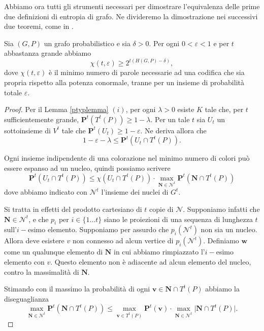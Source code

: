 Abbiamo ora tutti gli strumenti necessari per dimostrare l'equivalenza delle prime due definizioni di entropia di grafo. Ne divideremo la dimostrazione nei successivi due teoremi, come in \cite{Korner1973}. 
\begin{theorem}
	[K\"orner] Sia \((G,P)\) un grafo probabilistico e sia \(\delta>0\). Per ogni \(0<\varepsilon<1\) e per \(t\) abbastanza grande abbiamo
	\[\chi(t,\varepsilon)\ge 2^{t(H(G,P)-\delta)},\]
	dove \(\chi(t, \varepsilon)\) è il minimo numero di parole necessarie ad una codifica che sia propria rispetto alla potenza conormale, tranne per un insieme di probabilità totale \(\varepsilon\). 
\end{theorem}
\begin{proof}
	Per il Lemma \ref{ptyplemma} \((i)\), per ogni \(\lambda>0\) esiste \(K\) tale che, per \(t\) sufficientemente grande, \(\mathbf{P}^t(T^t(P))\ge 1-\lambda\). Per un tale \(t\) sia \(U_{t}\) un sottoinsieme di \(V^t\) tale che \(\mathbf{P}^t(U_{t})\ge 1-\varepsilon\). Ne deriva allora che 
	\begin{equation}
		\label{eq:epsilonlambda} 1-\varepsilon-\lambda\le \mathbf{P}^t(U_{t}\cap T^t(P)). 
	\end{equation}
	
	Ogni insieme indipendente di una colorazione nel minimo numero di colori può essere espanso ad un nucleo, quindi possiamo scrivere 
	\begin{equation}
		\label{eq:expansion} \mathbf{P}^t(U_{t}\cap T^t(P))\le \chi(U_{t}\cap T^t(P))\cdot\max_{\mathbf{N}\in \mathcal{N}^t} \mathbf{P}^t(\mathbf{N}\cap T^t(P)) 
	\end{equation}
	dove abbiamo indicato con \(\mathcal{N}^t\) l'insieme dei nuclei di \(G^t\).
	
	Si tratta in effetti del prodotto cartesiano di \(t\) copie di \(\mathcal{N}\). Supponiamo infatti che \(\mathbf{N}\in \mathcal{N}^t\), e che \(p_i\) per \(i\in\{1\dots t\}\) siano le proiezioni di una sequenza di lunghezza \(t\) sull'\(i-\)esimo elemento. Supponiamo per assurdo che \(p_i(\mathcal{N}^t)\) non sia un nucleo. Allora deve esistere \(v\) non connesso ad alcun vertice di \(p_i(\mathcal{N}^t)\). Definiamo \(\mathbf{w}\) come un qualunque elemento di \(\mathbf{N}\) in cui abbiamo rimpiazzato l'\(i-\)esimo elemento con \(v\). Questo elemento non è adiacente ad alcun elemento del nucleo, contro la massimalità di \(\mathbf{N}\).
	
	Stimando con il massimo la probabilità di ogni \(\mathbf{v}\in \mathbf{N}\cap T^{t}(P)\) abbiamo la diseguaglianza 
	\begin{equation}
		\label{eq:maxmax} \max_{\mathbf{N}\in \mathcal{N}^t} \mathbf{P}^t(\mathbf{N}\cap T^t(P))\le \max_{\mathbf{v}\in T^{t}(P)} \mathbf{P}^t(\mathbf{v})\cdot \max_{\mathbf{N}\in \mathcal{N}^t} \big\vert \mathbf{N}\cap T^t(P) \big\vert. 
	\end{equation}
	

\end{proof}
